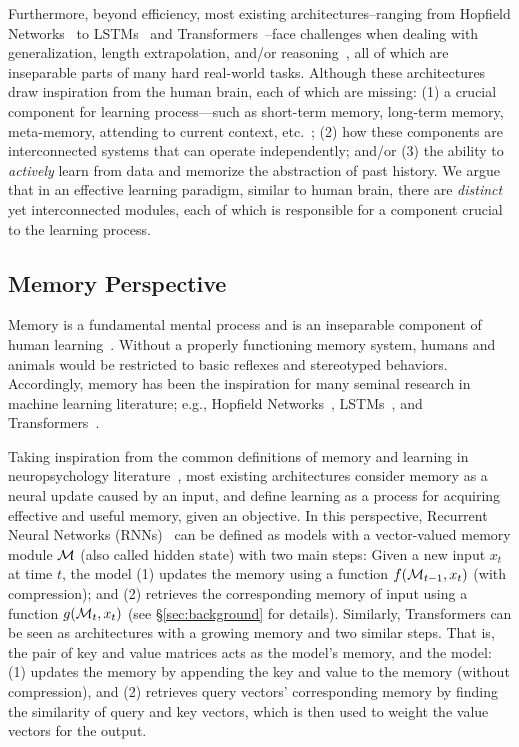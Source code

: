 Furthermore, beyond efficiency, most existing architectures–ranging from Hopfield Networks~\citep{hopfield1982neural} to LSTMs~\citep{LSTM} and Transformers~\citep{transformers}–face challenges when dealing with generalization, length extrapolation, and/or reasoning~\citep{anil2022exploring, qin2024exploring}, all of which are inseparable parts of many hard real-world tasks. Although these architectures draw inspiration from the human brain, each of which are missing: (1) a crucial component for learning process—such as short-term memory, long-term memory, meta-memory, attending to current context, etc.~\citep{cowan2008differences}; (2) how these components are interconnected systems that can operate independently; and/or (3) the ability to \emph{actively} learn from data and memorize the abstraction of past history. We argue that in an effective learning paradigm, similar to human brain, there are \emph{distinct} yet interconnected modules, each of which is responsible for a component crucial to the learning process.




\subsection*{\textcolor{c3}{Memory Perspective}}
Memory is a fundamental mental process and is an inseparable component of human learning~\citep{terry2017learning}. Without a properly functioning memory system, humans and animals would be restricted to basic reflexes and stereotyped behaviors. Accordingly, memory has been the inspiration for many seminal research in machine learning literature; e.g., Hopfield Networks~\citep{hopfield1982neural}, LSTMs~\citep{LSTM}, and Transformers~\citep{transformers}. 

Taking inspiration from the common definitions of memory and learning in neuropsychology literature~\citep{okano2000learning}, most existing architectures consider memory as a neural update caused by an input, and define learning as a process for acquiring effective and useful memory, given an objective. In this perspective, Recurrent Neural Networks (RNNs)~\citep{williams1989learning} can be defined as models with a vector-valued memory module $\mathcal{M}$ (also called hidden state) with two main steps: Given a new input $x_t$ at time $t$, the model (1) updates the memory using a function $f(\mathcal{M}_{t-1}, x_t)$ (with compression); and (2) retrieves the corresponding memory of input using a function $g(\mathcal{M}_{t}, x_t)$ (\textcolor{c1}{see \S}\ref{sec:background} \textcolor{c1}{for details}). Similarly, Transformers can be seen as architectures with a growing memory and two similar steps. That is, the pair of key and value matrices acts as the model's memory, and the model: (1) updates the memory by appending the key and value to the memory (without compression), and (2) retrieves query vectors' corresponding memory by finding the similarity of query and key vectors, which is then used to weight the value vectors for the output.

